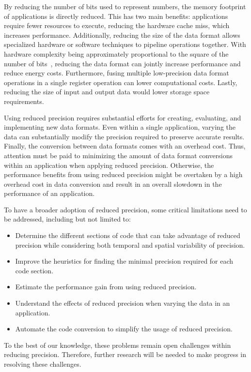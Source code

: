 By reducing the number of bits used to represent numbers, the memory footprint
of applications is directly reduced.
This has two main benefits: applications require fewer resources to execute, reducing the hardware cache miss, which increases performance.
Additionally, reducing the size of the data format allows specialized hardware
or software techniques to pipeline operations together.
With hardware complexity being approximately proportional to the square of the
number of bits~\cite{Chen2018-an}, reducing the data format can jointly increase
performance and reduce energy costs.
Furthermore, fusing multiple low-precision data format operations in a single register operation can lower computational costs. 
Lastly, reducing the size of input and output data would lower storage space requirements.

Using reduced precision requires substantial efforts for creating, evaluating, and implementing new data formats.
Even within a single application, varying the data can substantially modify the
precision required to preserve accurate results.
Finally, the conversion between data formats comes with an overhead cost.
Thus, attention must be paid to minimizing the amount of data format conversions
within an application when applying reduced precision.
Otherwise, the performance benefits from using reduced precision might be overtaken
by a high overhead cost in data conversion and result in an overall slowdown
in the performance of an application.

To have a broader adoption of reduced precision, some critical limitations need to
be addressed, including but not limited to:
\begin{itemize}
	\item Determine the different sections of code that can take advantage of reduced precision
	      while considering both temporal and spatial variability of precision.
	\item Improve the heuristics for finding the minimal precision required for each code section.
	\item Estimate the performance gain from using reduced precision.
	\item Understand the effects of reduced precision when varying the data in an application.
	\item Automate the code conversion to simplify the usage of reduced precision.
\end{itemize}
To the best of our knowledge, these problems remain open challenges within reducing precision.
Therefore, further research will be needed to make progress in resolving these challenges.
